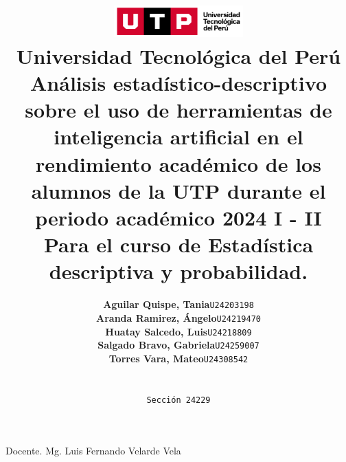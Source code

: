 \documentclass{article}
\title{
  \pagenumbering{gobble}
  \includegraphics[width=5cm]{./assets/logo-utp.png} \\
  \vspace{1cm}
  \textbf{Universidad Tecnológica del Perú} \\
  \vspace{2cm}
  \textbf{Análisis estadístico-descriptivo sobre el uso de herramientas de inteligencia artificial en el rendimiento académico de los alumnos de la UTP durante el periodo académico 2024 I - II} \\
  \vspace{1cm}
  \large \textbf{Para el curso de Estadística descriptiva y probabilidad.}
}
\author{
  \begin{tabular}{ll}
    \textbf{Aguilar Quispe, Tania} & \texttt{U24203198} \\
    \textbf{Aranda Ramirez, Ángelo} & \texttt{U24219470} \\
    \textbf{Huatay Salcedo, Luis} & \texttt{U24218809} \\
    \textbf{Salgado Bravo, Gabriela} & \texttt{U24259007} \\
    \textbf{Torres Vara, Mateo} & \texttt{U24308542} \\
  \end{tabular} \\\\
  \texttt{Sección 24229}
}
\begin{document}
\maketitle
\begin{center}

  Docente. Mg. Luis Fernando Velarde Vela

\end{center}

%
%

\newpage

\setcounter{page}{2}  

\tableofcontents
\thispagestyle{fancy}






















\end{document}
